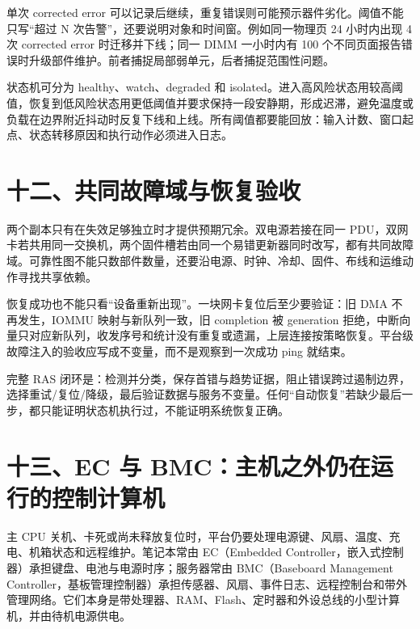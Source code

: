 
单次 corrected error 可以记录后继续，重复错误则可能预示器件劣化。阈值不能只写“超过 N 次告警”，还要说明对象和时间窗。例如同一物理页 24 小时内出现 4 次 corrected error 时迁移并下线；同一 DIMM 一小时内有 100 个不同页面报告错误时升级部件维护。前者捕捉局部弱单元，后者捕捉范围性问题。

状态机可分为 healthy、watch、degraded 和 isolated。进入高风险状态用较高阈值，恢复到低风险状态用更低阈值并要求保持一段安静期，形成迟滞，避免温度或负载在边界附近抖动时反复下线和上线。所有阈值都要能回放：输入计数、窗口起点、状态转移原因和执行动作必须进入日志。

\section{十二、共同故障域与恢复验收}

两个副本只有在失效足够独立时才提供预期冗余。双电源若接在同一 PDU，双网卡若共用同一交换机，两个固件槽若由同一个易错更新器同时改写，都有共同故障域。可靠性图不能只数部件数量，还要沿电源、时钟、冷却、固件、布线和运维动作寻找共享依赖。

恢复成功也不能只看“设备重新出现”。一块网卡复位后至少要验证：旧 DMA 不再发生，IOMMU 映射与新队列一致，旧 completion 被 generation 拒绝，中断向量只对应新队列，收发序号和统计没有重复或遗漏，上层连接按策略恢复。平台级故障注入的验收应写成不变量，而不是观察到一次成功 ping 就结束。

\begin{keyidea}
完整 RAS 闭环是：检测并分类，保存首错与趋势证据，阻止错误跨过遏制边界，选择重试/复位/降级，最后验证数据与服务不变量。任何“自动恢复”若缺少最后一步，都只能证明状态机执行过，不能证明系统恢复正确。
\end{keyidea}








\section{十三、EC 与 BMC：主机之外仍在运行的控制计算机}

主 CPU 关机、卡死或尚未释放复位时，平台仍要处理电源键、风扇、温度、充电、机箱状态和远程维护。笔记本常由 EC（Embedded Controller，嵌入式控制器）承担键盘、电池与电源时序；服务器常由 BMC（Baseboard Management Controller，基板管理控制器）承担传感器、风扇、事件日志、远程控制台和带外管理网络。它们本身是带处理器、RAM、Flash、定时器和外设总线的小型计算机，并由待机电源供电。

